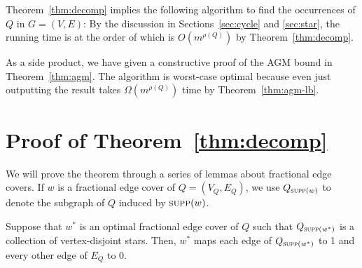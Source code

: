 Theorem~\ref{thm:decomp} implies the following algorithm to find the occurrences of $Q$ in $G = (V, E)$:
By the discussion in Sections~\ref{sec:cycle} and \ref{sec:star}, the running time is at the order of
which is $O(m^{\rho(Q)})$ by Theorem~\ref{thm:decomp}.

\vgap

As a side product, we have given a constructive proof of the AGM bound in Theorem~\ref{thm:agm}. The algorithm is worst-case optimal because even just outputting the result takes $\Omega(m^{\rho(Q)})$ time by Theorem~\ref{thm:agm-lb}.

\section{Proof of Theorem~\ref{thm:decomp}} \label{sec:proof-thm-decomp}

We will prove the theorem through a series of lemmas about fractional edge covers. If $w$ is a fractional edge cover of $Q  = (V_Q, E_Q)$, we use $Q_{\textsc{supp}(w)}$ to denote the subgraph of $Q$ induced by $\textsc{supp}(w)$.

\begin{lemma} \label{lmm:proof-h1}
   Suppose that $w^*$ is an optimal fractional edge cover of $Q$ such that $Q_{\textsc{supp}(w^*)}$ is a collection of vertex-disjoint stars. Then, $w^*$ maps each edge of $Q_{\textsc{supp}(w^*)}$ to 1 and every other edge of $E_Q$ to 0.
\end{lemma}

